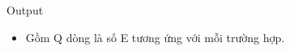 Output  
\begin{itemize}
	\item     Gồm Q dòng là số E tương ứng với mỗi trường hợp.   
\end{itemize}